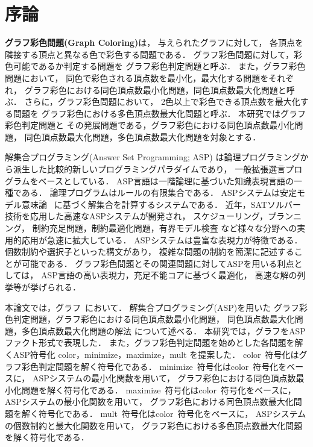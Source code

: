\chapter{序論}

\textbf{グラフ彩色問題(Graph Coloring)}は，
与えられたグラフに対して，
各頂点を隣接する頂点と異なる色で彩色する問題である．
グラフ彩色問題に対して，彩色可能であるか判定する問題を
グラフ彩色判定問題と呼ぶ．
また，グラフ彩色問題において，
同色で彩色される頂点数を最小化，最大化する問題をそれぞれ，
グラフ彩色における同色頂点数最小化問題，同色頂点数最大化問題と呼ぶ．
さらに，グラフ彩色問題において，
2色以上で彩色できる頂点数を最大化する問題を
グラフ彩色における多色頂点数最大化問題と呼ぶ．
本研究ではグラフ彩色判定問題と
その発展問題である，グラフ彩色における同色頂点数最小化問題，
同色頂点数最大化問題，多色頂点数最大化問題を対象とする．


解集合プログラミング(Answer Set Programming; ASP\cite{%
  Baral03:cambridge,%
  Gelfond88:iclp,%
  Niemela99:amai,%
  Inoue08:jssst})
は論理プログラミングから派生した比較的新しいプログラミングパラダイムであり，
一般拡張選言プログラムをベースとしている．
ASP言語は一階論理に基づいた知識表現言語の一種である．
論理プログラムはルールの有限集合である．
ASPシステムは安定モデル意味論~\cite{Gelfond88:iclp}
に基づく解集合を計算するシステムである．
近年，SATソルバー技術を応用した高速なASPシステムが開発され，
スケジューリング，プランニング，
制約充足問題，制約最適化問題，有界モデル検査
など様々な分野への実用的応用が急速に拡大している．
ASPシステムは豊富な表現力が特徴である．
個数制約や選択子といった構文があり，
複雑な問題の制約を簡潔に記述することが可能である．
グラフ彩色問題とその関連問題に対してASPを用いる利点としては，
ASP言語の高い表現力，充足不能コアに基づく最適化，
高速な解の列挙等が挙げられる．

本論文では，グラフ~\cite{Knuth:TAOCP:SAT}において．
解集合プログラミング(ASP)を用いた
グラフ彩色判定問題，グラフ彩色における同色頂点数最小化問題，
同色頂点数最大化問題，多色頂点数最大化問題の解法
について述べる．
本研究では，グラフをASPファクト形式で表現した．
また，グラフ彩色判定問題を始めとした各問題を解くASP符号化
\textsf{color}，\textsf{minimize}，\textsf{maximize}，\textsf{mult}
を提案した．
\textsf{color}~符号化はグラフ彩色判定問題を解く符号化である．
\textsf{minimize}~符号化は\textsf{color}~符号化をベースに，
ASPシステムの最小化関数を用いて，
グラフ彩色における同色頂点数最小化問題を解く符号化である．
\textsf{maximize}~符号化は\textsf{color}~符号化をベースに，
ASPシステムの最小化関数を用いて，
グラフ彩色における同色頂点数最大化問題を解く符号化である．
\textsf{mult}~符号化は\textsf{color}~符号化をベースに，
ASPシステムの個数制約と最大化関数を用いて，
グラフ彩色における多色頂点数最大化問題を解く符号化である．

